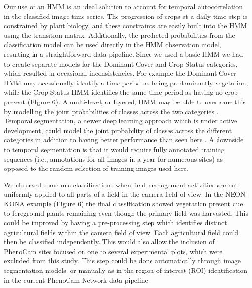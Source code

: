 \documentclass{article}
\begin{document}
Our use of an HMM is an ideal solution to account for temporal autocorrelation in the classified image time series. The progression of crops at a daily time step is constrained by plant biology, and these constraints are easily built into the HMM using the transition matrix. Additionally, the predicted probabilities from the classification model can be used directly in the HMM observation model, resulting in a straightforward data pipeline. Since we used a basic HMM we had to create separate models for the Dominant Cover and Crop Status categories, which resulted in occasional inconsistencies. For example the Dominant Cover HMM may occasionally identify a time period as being predominantly vegetation, while the Crop Status HMM identifies the same time period as having no crop present (FIgure 6). A multi-level, or layered, HMM may be able to overcome this by modelling the joint probabilities of classes across the two categories \citep{fine1998}. Temporal segmentation, a newer deep learning approach which is under active development, could model the joint probability of classes across the different categories in addition to having better performance than seen here \citep{lea2016}. A downside to temporal segmentation is that it would require fully annotated training sequences (i.e., annotations for all images in a year for numerous sites) as opposed to the random selection of training images used here. 

We observed some mis-classifications when field management activities are not uniformly applied to all parts of a field in the camera field of view. In the NEON-KONA example (Figure 6) the final classification showed vegetation present due to foreground plants remaining even though the primary field was harvested. This could be improved by having a pre-processing step which identifies distinct agricultural fields within the camera field of view. Each agricultural field could then be classified independently. This would also allow the inclusion of PhenoCam sites focused on one to several experimental plots, which were excluded from this study. This step could be done automatically through image segmentation models, or manually as in the region of interest (ROI) identification in the current PhenoCam Network data pipeline \citep{richardson2018a}.
\end{document}
